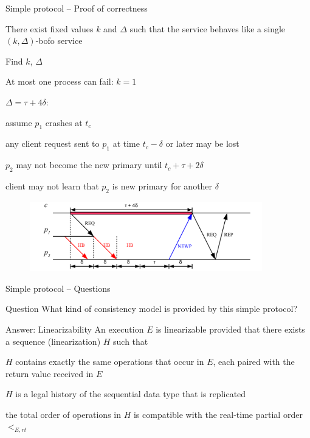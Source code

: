 \begin{frame}{Simple protocol -- Proof of correctness}
	
\BIL
\item[PB3] There exist fixed values $k$ and $\Delta$ such that the service
behaves like a single $(k, \Delta)$-bofo service
\item[Proof] Find $k$, $\Delta$
\BI
\item At most one process can fail: $k=1$
\item $\Delta = \tau + 4\delta$:
\BI
\item assume $p_1$ crashes at $t_c$
\item any client request sent to $p_1$ at time $t_c - \delta$ or later may be lost
\item $p_2$ may not become the new primary until $t_c + \tau + 2\delta$
\item client may not learn that $p_2$ is new primary for another $\delta$
\EI
\EI
\EIL

\begin{figure}
	\includegraphics[width=0.9\textwidth]{figs/09/pb2}
\end{figure}

\end{frame}

\begin{frame}{Simple protocol -- Questions}

\begin{block}{Question}	
What kind of consistency model is provided by this simple protocol?
\end{block}

\pause
\bigskip
\begin{block}{Answer: Linearizability}
An execution $E$ is linearizable provided that there exists a sequence (\alert{linearization}) $H$ such that
\BE
\item[L1] $H$ contains exactly the same operations that occur in $E$, each paired with the return value received in $E$
\item[L2] $H$ is a legal history of the sequential data type that is replicated
\item[L3] the total order of operations in $H$ is \alert{compatible} with the real-time partial order $<_{E,rt}$
\EE	
\end{block}


\end{frame}

